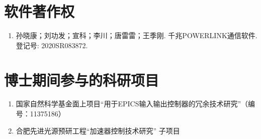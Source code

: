 \begin{publications}
\section*{软件著作权}
\begin{enumerate}
\item 孙晓康；刘功发；宣科；李川；唐雷雷；王季刚. 千兆POWERLINK通信软件. 登记号: 2020SR083872.
\end{enumerate}

\section*{博士期间参与的科研项目}
\begin{enumerate}
    \item 国家自然科学基金面上项目“用于EPICS输入输出控制器的冗余技术研究”（编号：11375186）
    
    \item 合肥先进光源预研工程“加速器控制技术研究” 子项目
\end{enumerate}

\end{publications}
